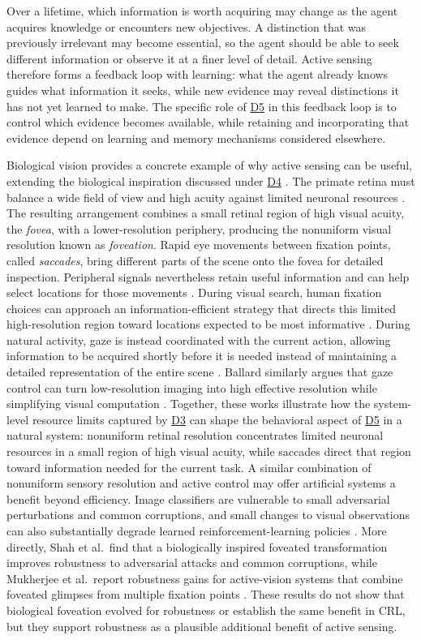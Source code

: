 \documentclass[10pt,journal,compsoc]{IEEEtran}
\DeclareRobustCommand{\Dref}[1]{\hyperref[sec:d#1]{D#1}}
\begin{document}
Over a lifetime, which information is worth acquiring may change as the agent acquires knowledge or encounters new objectives.
A distinction that was previously irrelevant may become essential, so the agent should be able to seek different information or observe it at a finer level of detail.
Active sensing therefore forms a feedback loop with learning: what the agent already knows guides what information it seeks, while new evidence may reveal distinctions it has not yet learned to make.
The specific role of \Dref{5} in this feedback loop is to control which evidence becomes available, while retaining and incorporating that evidence depend on learning and memory mechanisms considered elsewhere.

Biological vision provides a concrete example of why active sensing can be useful, extending the biological inspiration discussed under \Dref{4} \cite{zador2023}.
The primate retina must balance a wide field of view and high acuity against limited neuronal resources \cite{mccann2011}.
The resulting arrangement combines a small retinal region of high visual acuity, the \emph{fovea}, with a lower-resolution periphery, producing the nonuniform visual resolution known as \emph{foveation}.
Rapid eye movements between fixation points, called \emph{saccades}, bring different parts of the scene onto the fovea for detailed inspection.
Peripheral signals nevertheless retain useful information and can help select locations for those movements \cite{mccann2011}.
During visual search, human fixation choices can approach an information-efficient strategy that directs this limited high-resolution region toward locations expected to be most informative \cite{najemnik2005}.
During natural activity, gaze is instead coordinated with the current action, allowing information to be acquired shortly before it is needed instead of maintaining a detailed representation of the entire scene \cite{hayhoe2003}.
Ballard similarly argues that gaze control can turn low-resolution imaging into high effective resolution while simplifying visual computation \cite{ballard1991}.
Together, these works illustrate how the system-level resource limits captured by \Dref{3} can shape the behavioral aspect of \Dref{5} in a natural system: nonuniform retinal resolution concentrates limited neuronal resources in a small region of high visual acuity, while saccades direct that region toward information needed for the current task.
A similar combination of nonuniform sensory resolution and active control may offer artificial systems a benefit beyond efficiency.
Image classifiers are vulnerable to small adversarial perturbations and common corruptions, and small changes to visual observations can also substantially degrade learned reinforcement-learning policies \cite{goodfellow2015,hendrycks2019,huang2017}.
More directly, Shah et al.\ find that a biologically inspired foveated transformation improves robustness to adversarial attacks and common corruptions, while Mukherjee et al.\ report robustness gains for active-vision systems that combine foveated glimpses from multiple fixation points \cite{shah2023,mukherjee2025}.
These results do not show that biological foveation evolved for robustness or establish the same benefit in CRL, but they support robustness as a plausible additional benefit of active sensing.
\end{document}
